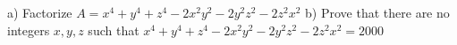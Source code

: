 a) Factorize $A= x^4+y^4+z^4-2x^2y^2-2y^2z^2-2z^2x^2$
b) Prove that there are no integers $x,y,z$ such that $x^4+y^4+z^4-2x^2y^2-2y^2z^2-2z^2x^2=2000 $